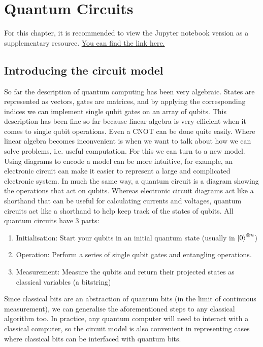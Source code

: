 \chapter{Quantum Circuits}

For this chapter, it is recommended to view the Jupyter notebook version as a supplementary resource. \href{https://github.com/SolemnShark871/YAItQC/blob/main/Chapters/7_Quantum_circuits.ipynb}{You can find the link here.}

\section{Introducing the circuit model}

So far the description of quantum computing has been very algebraic. States are represented as vectors, gates are matrices, and by applying the corresponding indices we can implement single qubit gates on an array of qubits. This description has been fine so far because linear algebra is very efficient when it comes to single qubit operations. Even a CNOT can be done quite easily. Where linear algebra becomes inconvenient is when we want to talk about how we can solve problems, i.e. useful computation. For this we can turn to a new model. Using diagrams to encode a model can be more intuitive, for example, an electronic circuit can make it easier to represent a large and complicated electronic system. In much the same way, a quantum circuit is a diagram showing the operations that act on qubits. Whereas electronic circuit diagrams act like a shorthand that can be useful for calculating currents and voltages, quantum circuits act like a shorthand to help keep track of the states of qubits. All quantum circuits have 3 parts:

\begin{enumerate}
    \item Initialisation: Start your qubits in an initial quantum state (usually in $\ket{0}^{\otimes n}$)
    \item Operation: Perform a series of single qubit gates and entangling operations.
    \item Measurement: Measure the qubits and return their projected states as classical variables (a bitstring)
\end{enumerate}

Since classical bits are an abstraction of quantum bits (in the limit of continuous measurement), we can generalise the aforementioned steps to any classical algorithm too. In practice, any quantum computer will need to interact with a classical computer, so the circuit model is also convenient in representing cases where classical bits can be interfaced with quantum bits. 


